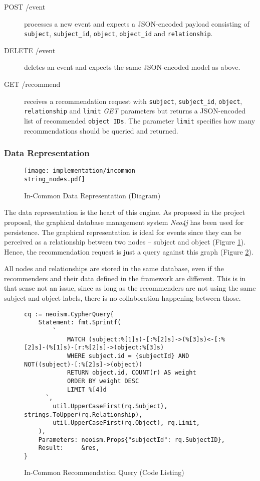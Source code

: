 \begin{description}
    \item[POST /event] processes a new event and expects a JSON-encoded payload consisting of \texttt{subject}, \texttt{subject_id}, \texttt{object}, \texttt{object_id} and \texttt{relationship}.
    \item[DELETE /event] deletes an event and expects the same JSON-encoded model as above.
    \item[GET /recommend] receives a recommendation request with \texttt{subject}, \texttt{subject_id}, \texttt{object}, \texttt{relationship} and \texttt{limit} \emph{GET} parameters but returns a JSON-encoded list of recommended \texttt{object IDs}. The parameter \texttt{limit} specifies how many recommendations should be queried and returned.
\end{description}

\subsubsection{Data Representation}

\begin{figure}[ht]
    \texttt{[image: implementation/incommon\\string\_nodes.pdf]}
    \caption{In-Common Data Representation (Diagram)}
    \label{fig:implementation-incommon-nodes}
\end{figure}

The data representation is the heart of this engine. As proposed in the project proposal, the graphical database management system \emph{Neo4j} has been used for persistence. The graphical representation is ideal for events since they can be perceived as a relationship between two nodes -- subject and object (Figure \ref{fig:implementation-incommon-nodes}). Hence, the recommendation request is just a query against this graph (Figure \ref{fig:implementation-incommon-recommendation-query}).

All nodes and relationships are stored in the same database, even if the recommenders and their data defined in the framework are different. This is in that sense not an issue, since as long as the recommenders are not using the same subject and object labels, there is no collaboration happening between those.

\begin{figure}[!ht]
    \begin{verbatim}
cq := neoism.CypherQuery{
    Statement: fmt.Sprintf(
        `
            MATCH (subject:%[1]s)-[:%[2]s]->(%[3]s)<-[:%[2]s]-(%[1]s)-[r:%[2]s]->(object:%[3]s)
            WHERE subject.id = {subjectId} AND NOT((subject)-[:%[2]s]->(object))
            RETURN object.id, COUNT(r) AS weight
            ORDER BY weight DESC
            LIMIT %[4]d
      `,
        util.UpperCaseFirst(rq.Subject), strings.ToUpper(rq.Relationship),
        util.UpperCaseFirst(rq.Object), rq.Limit,
    ),
    Parameters: neoism.Props{"subjectId": rq.SubjectID},
    Result:     &res,
}
    \end{verbatim}
    \caption{In-Common Recommendation Query (Code Listing)}
    \label{fig:implementation-incommon-recommendation-query}
\end{figure}

